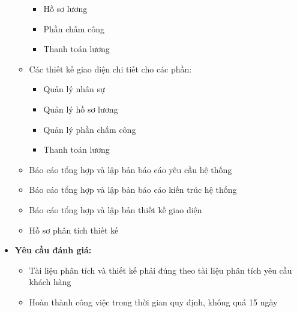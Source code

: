 \begin{itemize}
\begin{itemize}
\begin{itemize}
            \item Hồ sơ lương
            \item Phần chấm công
            \item Thanh toán lương
        \end{itemize}
        \item Các thiết kế giao diện chi tiết cho các phần:
        \begin{itemize}
            \item Quản lý nhân sự
            \item Quản lý hồ sơ lương
            \item Quản lý phần chấm công
            \item Thanh toán lương
        \end{itemize}
        \item Báo cáo tổng hợp và lập bản báo cáo yêu cầu hệ thống
        \item Báo cáo tổng hợp và lập bản báo cáo kiến trúc hệ thống
        \item Báo cáo tổng hợp và lập bản thiết kế giao diện
        \item Hồ sơ phân tích thiết kế
    \end{itemize}
    \item \textbf{Yêu cầu đánh giá:}
    \begin{itemize}
        \item Tài liệu phân tích và thiết kế phải đúng theo tài liệu phân tích yêu cầu khách hàng
        \item Hoàn thành công việc trong thời gian quy định, không quá 15 ngày
    \end{itemize}
\end{itemize}
